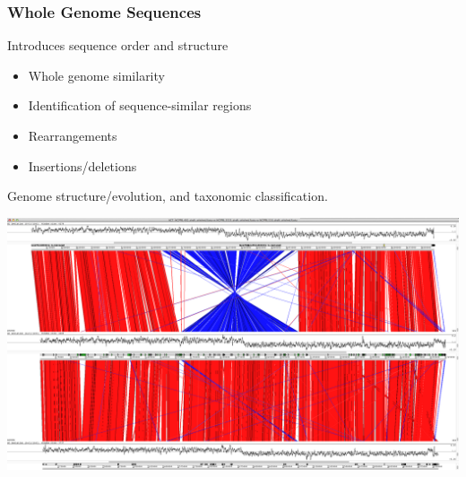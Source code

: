 \begin{frame}
  \frametitle{Whole Genome Sequences}
  Introduces sequence order and structure
  \begin{itemize}
    \item Whole genome similarity
    \item Identification of sequence-similar regions
    \item Rearrangements
    \item Insertions/deletions
  \end{itemize}    
  Genome structure/evolution, and taxonomic classification.
  \begin{center}
    \includegraphics[height=0.4\textheight]{images/act_comparison}
  \end{center}  
\end{frame}

